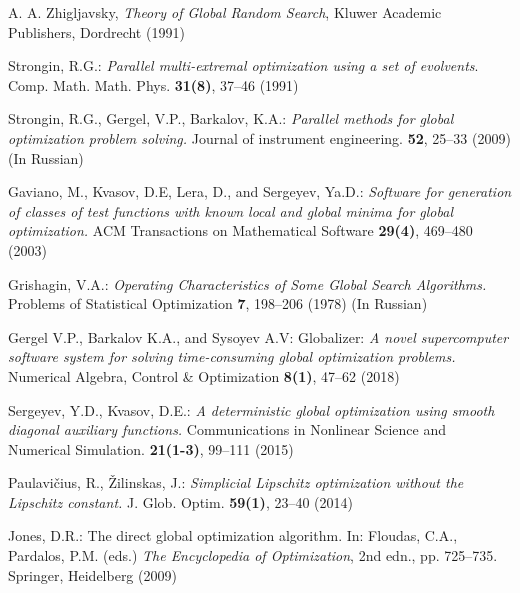 \documentclass[runningheads]{llncs}
\begin{document}
\begin{thebibliography}{107}
\newblock A. A. Zhigljavsky,
\newblock \emph{Theory of Global Random Search},
\newblock Kluwer Academic Publishers, Dordrecht (1991)

Strongin, R.G.: \emph{Parallel multi-extremal optimization using a set of evolvents}. Comp. Math.
Math. Phys. \textbf{31(8)}, 37--46 (1991)

Strongin, R.G., Gergel, V.P., Barkalov, K.A.: \emph{Parallel methods for global optimization problem
solving.} Journal of instrument engineering. \textbf{52}, 25--33 (2009) (In Russian)

Gaviano, M., Kvasov, D.E, Lera, D., and Sergeyev, Ya.D.: \emph{Software for generation of classes
of test functions with known local and global minima for global optimization.} ACM
Transactions on Mathematical Software \textbf{29(4)}, 469--480 (2003)

Grishagin, V.A.: \emph{Operating Characteristics of Some Global Search Algorithms.} Problems of
Statistical Optimization \textbf{7}, 198--206 (1978) (In Russian)

Gergel V.P., Barkalov K.A., and Sysoyev A.V: Globalizer: \emph{A novel supercomputer software
system for solving time-consuming global optimization problems.} Numerical Algebra, Control
\& Optimization \textbf{8(1)}, 47--62 (2018)


Sergeyev, Y.D., Kvasov, D.E.: \emph{A deterministic global optimization using smooth diagonal
auxiliary functions.} Communications in Nonlinear Science and Numerical Simulation. \textbf{21(1-3)},
99--111 (2015)


Paulavi\v cius, R., \v Zilinskas, J.: \emph{Simplicial Lipschitz optimization without the Lipschitz
constant.} J. Glob. Optim. \textbf{59(1)}, 23--40 (2014)

Jones, D.R.: The direct global optimization algorithm. In: Floudas, C.A., Pardalos, P.M.
(eds.) \emph{The Encyclopedia of Optimization}, 2nd edn., pp. 725--735. Springer, Heidelberg
(2009)


\end{thebibliography}
\end{document}
